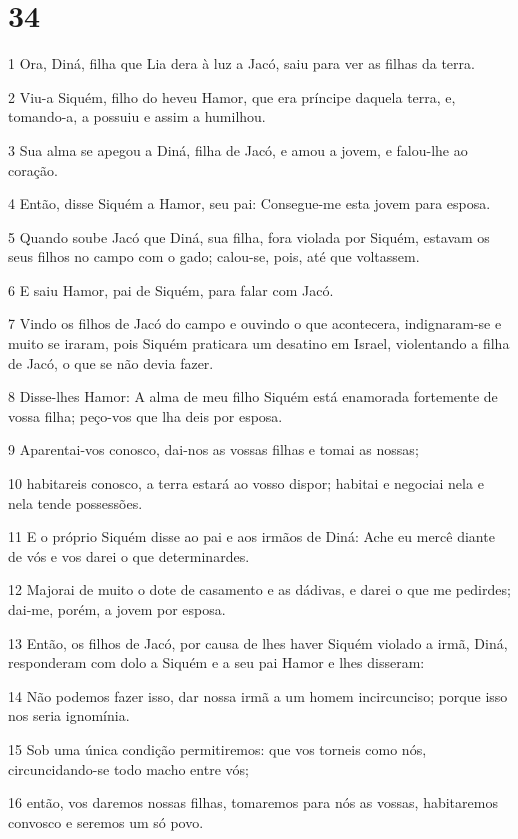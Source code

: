 \chapter{34}

\par 1 Ora, Diná, filha que Lia dera à luz a Jacó, saiu para ver as filhas da terra.
\par 2 Viu-a Siquém, filho do heveu Hamor, que era príncipe daquela terra, e, tomando-a, a possuiu e assim a humilhou.
\par 3 Sua alma se apegou a Diná, filha de Jacó, e amou a jovem, e falou-lhe ao coração.
\par 4 Então, disse Siquém a Hamor, seu pai: Consegue-me esta jovem para esposa.
\par 5 Quando soube Jacó que Diná, sua filha, fora violada por Siquém, estavam os seus filhos no campo com o gado; calou-se, pois, até que voltassem.
\par 6 E saiu Hamor, pai de Siquém, para falar com Jacó.
\par 7 Vindo os filhos de Jacó do campo e ouvindo o que acontecera, indignaram-se e muito se iraram, pois Siquém praticara um desatino em Israel, violentando a filha de Jacó, o que se não devia fazer.
\par 8 Disse-lhes Hamor: A alma de meu filho Siquém está enamorada fortemente de vossa filha; peço-vos que lha deis por esposa.
\par 9 Aparentai-vos conosco, dai-nos as vossas filhas e tomai as nossas;
\par 10 habitareis conosco, a terra estará ao vosso dispor; habitai e negociai nela e nela tende possessões.
\par 11 E o próprio Siquém disse ao pai e aos irmãos de Diná: Ache eu mercê diante de vós e vos darei o que determinardes.
\par 12 Majorai de muito o dote de casamento e as dádivas, e darei o que me pedirdes; dai-me, porém, a jovem por esposa.
\par 13 Então, os filhos de Jacó, por causa de lhes haver Siquém violado a irmã, Diná, responderam com dolo a Siquém e a seu pai Hamor e lhes disseram:
\par 14 Não podemos fazer isso, dar nossa irmã a um homem incircunciso; porque isso nos seria ignomínia.
\par 15 Sob uma única condição permitiremos: que vos torneis como nós, circuncidando-se todo macho entre vós;
\par 16 então, vos daremos nossas filhas, tomaremos para nós as vossas, habitaremos convosco e seremos um só povo.
